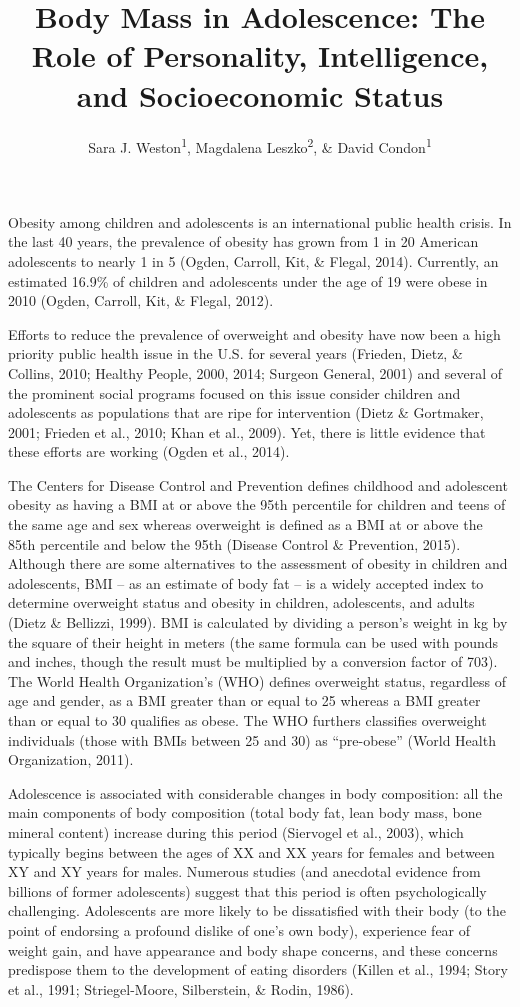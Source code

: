 \documentclass[man]{apa6}
\title{Body Mass in Adolescence: The Role of Personality, Intelligence, and Socioeconomic Status}
\author{Sara J. Weston\textsuperscript{1}, Magdalena Leszko\textsuperscript{2}, \& David Condon\textsuperscript{1}}
\date{}
\affiliation{
\vspace{0.5cm}
\textsuperscript{1} University of Oregon\\\textsuperscript{2} University of Szczecin}
\begin{document}
\maketitle

\setlength{\parskip}{0pt}
 \raggedbottom

Obesity among children and adolescents is an international public health crisis. In the last 40 years, the prevalence of obesity has grown from 1 in 20 American adolescents to nearly 1 in 5 (Ogden, Carroll, Kit, \& Flegal, 2014). Currently, an estimated 16.9\% of children and adolescents under the age of 19 were obese in 2010 (Ogden, Carroll, Kit, \& Flegal, 2012).

Efforts to reduce the prevalence of overweight and obesity have now been a high priority public health issue in the U.S. for several years (Frieden, Dietz, \& Collins, 2010; Healthy People, 2000, 2014; Surgeon General, 2001) and several of the prominent social programs focused on this issue consider children and adolescents as populations that are ripe for intervention (Dietz \& Gortmaker, 2001; Frieden et al., 2010; Khan et al., 2009). Yet, there is little evidence that these efforts are working (Ogden et al., 2014).

The Centers for Disease Control and Prevention defines childhood and adolescent obesity as having a BMI at or above the 95th percentile for children and teens of the same age and sex whereas overweight is defined as a BMI at or above the 85th percentile and below the 95th (Disease Control \& Prevention, 2015). Although there are some alternatives to the assessment of obesity in children and adolescents, BMI -- as an estimate of body fat -- is a widely accepted index to determine overweight status and obesity in children, adolescents, and adults (Dietz \& Bellizzi, 1999). BMI is calculated by dividing a person's weight in kg by the square of their height in meters (the same formula can be used with pounds and inches, though the result must be multiplied by a conversion factor of 703). The World Health Organization's (WHO) defines overweight status, regardless of age and gender, as a BMI greater than or equal to 25 whereas a BMI greater than or equal to 30 qualifies as obese. The WHO furthers classifies overweight individuals (those with BMIs between 25 and 30) as \enquote{pre-obese} (World Health Organization, 2011).

Adolescence is associated with considerable changes in body composition: all the main components of body composition (total body fat, lean body mass, bone mineral content) increase during this period (Siervogel et al., 2003), which typically begins between the ages of XX and XX years for females and between XY and XY years for males. Numerous studies (and anecdotal evidence from billions of former adolescents) suggest that this period is often psychologically challenging. Adolescents are more likely to be dissatisfied with their body (to the point of endorsing a profound dislike of one's own body), experience fear of weight gain, and have appearance and body shape concerns, and these concerns predispose them to the development of eating disorders (Killen et al., 1994; Story et al., 1991; Striegel-Moore, Silberstein, \& Rodin, 1986).
\end{document}
